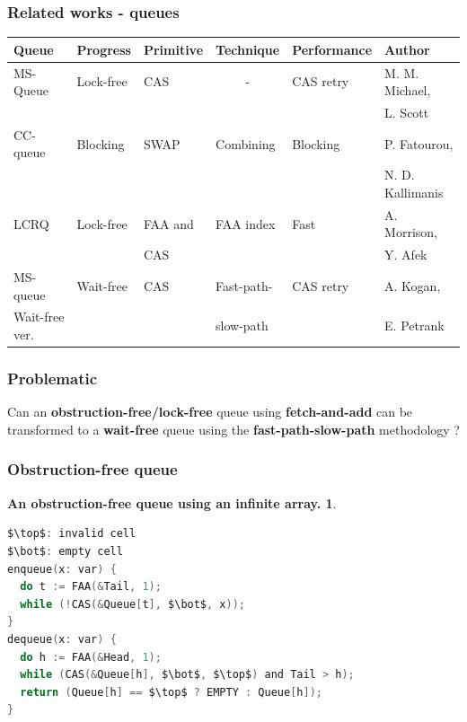 \documentclass[10pt,a4paper]{beamer}
\begin{document}
\begin{frame}
  \frametitle{Related works - queues}
  \small
  \begin{tabular}{|l|l|l|l|l|l|}\hline
    Queue & Progress & Primitive & Technique & Performance & Author \\\hline
    MS-Queue & Lock-free & CAS & \multicolumn{1}{|c|}{-} & CAS retry & M. M. Michael, \\
    & & & & & L. Scott \\\hline
    CC-queue & Blocking & SWAP & Combining & Blocking & P. Fatourou, \\
    & & & & & N. D. Kallimanis \\\hline
    LCRQ & Lock-free & FAA and & FAA index & Fast & A. Morrison, \\
    & & CAS & & & Y. Afek \\\hline
    MS-queue & Wait-free & CAS & Fast-path- & CAS retry & A. Kogan,\\
    Wait-free ver. & & & slow-path & & E. Petrank \\\hline
  \end{tabular}
\end{frame}

\begin{frame}
  \frametitle{Problematic}
  \large Can an \textbf{obstruction-free/lock-free} queue using
  \textbf{fetch-and-add} can be transformed to a \textbf{wait-free} queue using
  the \textbf{fast-path-slow-path} methodology ?
\end{frame}

\begin{frame}[fragile]
  \frametitle{Obstruction-free queue}
  \theoremstyle{example}
  \newtheorem{algo}[theorem]{An obstruction-free queue using an infinite array.}
  \begin{algo}
\begin{lstlisting}[mathescape,
                   frame=single,
                   label={lst:queue},
                   language=C]
$\top$: invalid cell
$\bot$: empty cell
enqueue(x: var) {
  do t := FAA(&Tail, 1); 
  while (!CAS(&Queue[t], $\bot$, x));
}
dequeue(x: var) {
  do h := FAA(&Head, 1);
  while (CAS(&Queue[h], $\bot$, $\top$) and Tail > h);
  return (Queue[h] == $\top$ ? EMPTY : Queue[h]);
}
\end{lstlisting}
  \end{algo}
\end{frame}
\end{document}
